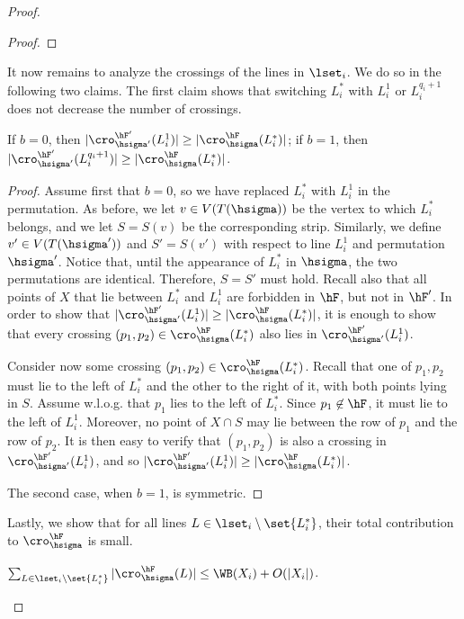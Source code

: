 \begin{proof}
\begin{proof}
	\end{proof}
	
	It now remains to analyze the crossings of the lines in $\lset_i$. We do so in the following two claims. The first claim shows that switching $L^*_i$ with $L^1_i$ or $L^{q_i+1}_i$ does not decrease the number of crossings.
	
	\begin{claim}
		If $b=0$, then	$|\cro^{\hF'}_{\hsigma'}(L_i^1)|\geq |\cro^{\hF}_{\hsigma}(L^*_i)|$; if $b=1$, then $|\cro^{\hF'}_{\hsigma'}(L_i^{q_i+1})|\geq |\cro^{\hF}_{\hsigma}(L^*_i)|$.
	\end{claim}
	
	\begin{proof}
		Assume first that $b=0$, so we have replaced $L^*_i$ with $L_i^1$ in the permutation. As before, we let $v\in V(T({\hsigma}))$ be the vertex to which $L^*_i$ belongs, and we let $S=S(v)$ be the corresponding strip. Similarly, we define $v'\in V(T({\hsigma'}))$ and $S'=S(v')$ with respect to line $L_i^1$ and permutation $\hsigma'$. Notice that, until the appearance of $L^*_i$ in $\hsigma$, the two permutations are identical. Therefore, $S=S'$ must hold. Recall also that all points of $X$ that lie between $L^*_i$ and $L_i^1$ are forbidden in $\hF$, but not in $\hF'$. In order to show that $|\cro^{\hF'}_{\hsigma'}(L_i^1)|\geq |\cro^{\hF}_{\hsigma}(L^*_i)|$, it is enough to show that every crossing $(p_1,p_2)\in \cro^{\hF}_{\hsigma}(L^*_i)$ also lies in $\cro^{\hF'}_{\hsigma'}(L_i^1)$. 
		
		Consider now some crossing $(p_1,p_2)\in \cro^{\hF}_{\hsigma}(L^*_i)$. Recall that one of $p_1,p_2$ must lie to the left of $L_i^*$ and the other to the right of it, with both points lying in $S$. Assume w.l.o.g. that $p_1$ lies to the left of $L_i^*$. Since $p_1\not\in \hF$, it must lie to the left of $L^1_i$. Moreover, no point of $X\cap S$ may lie between the row of $p_1$ and the row of $p_2$. It is then easy to verify that $(p_1,p_2)$ is also a crossing in $\cro^{\hF'}_{\hsigma'}(L_i^1)$, and so $|\cro^{\hF'}_{\hsigma'}(L_i^1)|\geq |\cro^{\hF}_{\hsigma}(L^*_i)|$.
		
		The second case, when $b=1$, is symmetric.
	\end{proof}
	
	Lastly, we show that for all lines $L\in \lset_i\setminus\set{L_i^*}$, their total contribution to $\cro^{\hF}_{\hsigma}$ is small. 
	
	\begin{claim}\label{claim: lines in li contribute little}
		$\sum_{L\in \lset_i\setminus\set{L_i^*}}|\cro^{\hF}_{\hsigma}(L)|\leq \WB(X_i)+O(|X_i|)$.
	\end{claim}
	

\end{proof}
